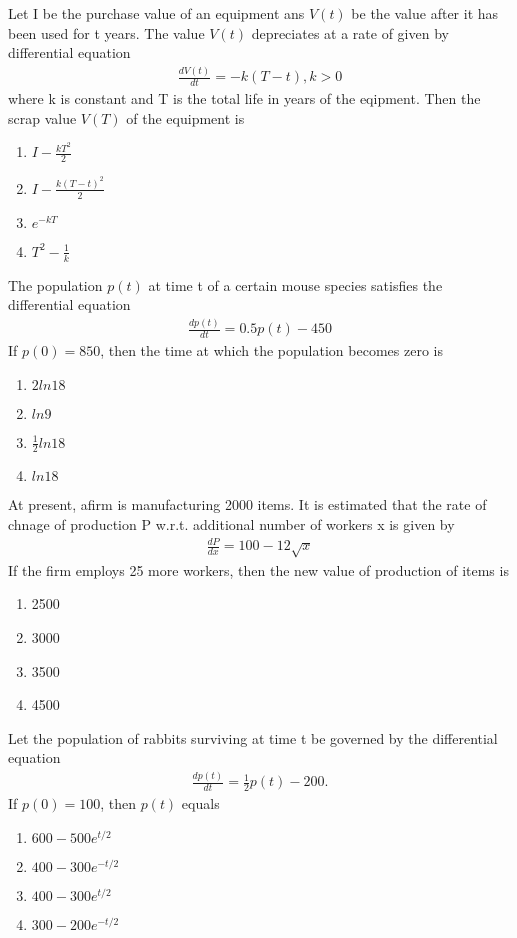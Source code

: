 \item Let I be the purchase value of an equipment ans $V(t)$ be the value after it has been used for t years. The value 
$V(t)$ depreciates at a rate of given by differential equation 
\begin{align*}
\frac{dV(t)}{dt} = -k(T - t), k > 0
\end{align*}
where k is constant and T is the total life in years of the eqipment. Then the scrap value $V(T)$ of the equipment is
\begin{enumerate}
\item $I - \frac{kT^2}{2}$
\item $I - \frac{k(T - t)^2}{2}$
\item $e^{-kT}$
\item $T^2 - \frac{1}{k}$
\end{enumerate} 

\item The population $p(t)$ at time t of a certain mouse species satisfies the differential equation
\begin{align*}
\frac{dp(t)}{dt} = 0.5p(t) - 450
\end{align*}
If $p(0) = 850$, then the time at which the population becomes zero is
\begin{enumerate}
\item $2ln18$
\item $ln9$
\item $\frac{1}{2}ln18$
\item $ln18$
\end{enumerate}

\item At present, afirm is manufacturing 2000 items. It is estimated that the rate of chnage of production P w.r.t. additional number of workers x is given by
\begin{align*}
\frac{dP}{dx} = 100  - 12\sqrt{x}
\end{align*}
If the firm employs 25 more workers, then the new value of production of items is
\begin{enumerate}
\item 2500
\item 3000
\item 3500
\item 4500
\end{enumerate}

\item Let the population of rabbits surviving at time t be governed by the differential equation
\begin{align*}
\frac{dp(t)}{dt} = \frac{1}{2}p(t) - 200.
\end{align*}
If $p(0) = 100$, then $p(t)$ equals
\begin{enumerate}
\item $600 - 500e^{t/2}$
\item $400 - 300e^{-t/2}$
\item $400 - 300e^{t/2}$
\item $300 - 200e^{-t/2}$
\end{enumerate}

